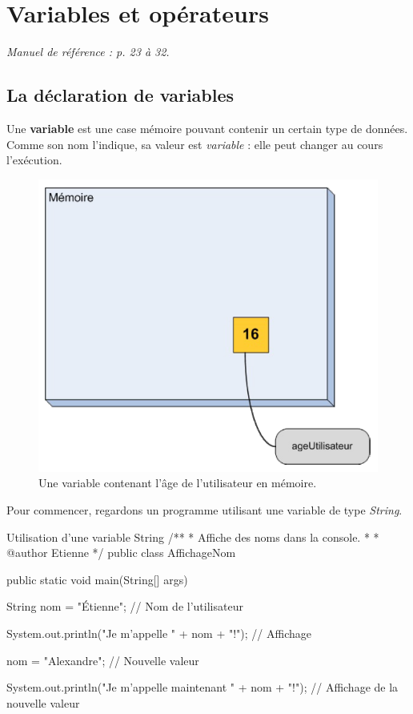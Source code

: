 \documentclass[12pt]{report}
\begin{document}
\chapter{Variables et opérateurs}

\textit{Manuel de référence : p. 23 à 32.}

%
\section{La déclaration de variables}
%
Une \textbf{variable} est une case mémoire pouvant contenir un certain type de données. Comme son nom l'indique, sa valeur est \emph{variable} : elle peut changer au cours l'exécution.

\begin{figure}[!ht]
	\centering
	\includegraphics[scale=0.75]{variable-memoire.png}
	\caption{Une variable contenant l'âge de l'utilisateur en mémoire.}
\end{figure}

Pour commencer, regardons un programme utilisant une variable de type \emph{String}.

\begin{MyTCB}{Utilisation d'une variable String}
/**
 * Affiche des noms dans la console.
 * 
 * @author Etienne
 */
public class AffichageNom {

	public static void main(String[] args) {
		
		String nom = "Étienne"; // Nom de l'utilisateur
		
		System.out.println("Je m'appelle " + nom + "!"); // Affichage
		
		nom = "Alexandre"; // Nouvelle valeur
		
		System.out.println("Je m'appelle maintenant " + nom + "!"); // Affichage de la nouvelle valeur
		
	}

}
\end{MyTCB}
\end{document}
